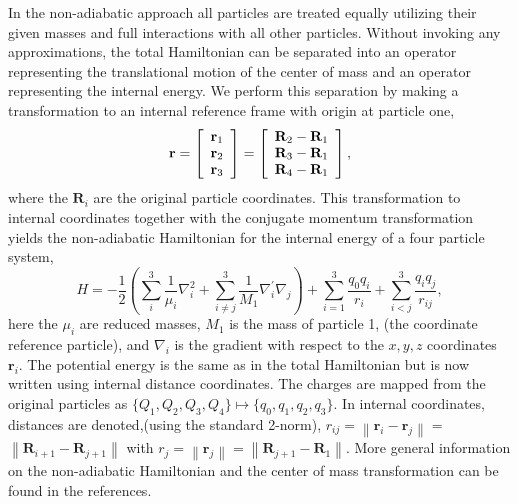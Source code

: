 \documentclass[12pt]{article}
\begin{document}
In the non-adiabatic approach all particles are treated equally utilizing
their given masses and full interactions with all other particles. 
Without invoking any approximations, the total Hamiltonian 
can be separated into an operator representing the translational motion
of the center of mass and an operator representing the internal energy.
We perform this separation by making a transformation to an internal
reference frame with origin at particle one,
\begin{equation} \label{rdef}
\mathbf{r}=\left[
  \begin{array}[c]{c}
    \mathbf{r}_{1}\\
    \mathbf{r}_{2}\\
    \mathbf{r}_{3}
  \end{array}
  \right]  
  = \left[
    \begin{array}[c]{c}
      \mathbf{R}_{2}-\mathbf{R}_{1}\\
      \mathbf{R}_{3}-\mathbf{R}_{1}\\
      \mathbf{R}_{4}-\mathbf{R}_{1}\\
    \end{array}
  \right],
\end{equation}
where the $\mathbf{R}_{i}$ are the original particle coordinates.
This transformation to  internal coordinates together with the 
conjugate momentum transformation yields the non-adiabatic Hamiltonian
for the internal energy of a four particle system,
\begin{equation} \label{intham1}
H=-\frac{1}{2}\left(  \sum_{i}^{3}\frac{1}{\mu_{i}}\nabla_{i}^{2}
  +\sum_{i\neq j}^{3}\frac{1}{M_{1}}\nabla_{i}^{\prime}\nabla_{j} \right)
  +\sum_{i=1}^{3}\frac{q_{0}q_{i}}{r_{i}}  
  +\sum_{i<j}^{3}\frac{q_{i}q_{j}}{r_{ij}},
\end{equation}
here the $\mu_{i}$ are reduced masses, $M_{1}$ is the mass of particle 1,
(the coordinate reference particle), and $\nabla_{i}$ is the gradient with
respect to the $x,y,z$ coordinates $\mathbf{r}_{i}$. The potential energy is
the same as in the total Hamiltonian but is now written using internal
distance coordinates. The charges are mapped from the original particles as
$\{Q_{1},Q_{2},Q_{3},Q_{4}\}\mapsto\{q_{0},q_{1},q_{2},q_{3}\}$. 
In internal coordinates, distances are denoted,(using the standard 2-norm), 
$r_{ij}=\left\|  \mathbf{r}_{i}-\mathbf{r}_{j}\right\|  =$ 
$\left\|  \mathbf{R}_{i+1}-\mathbf{R}_{j+1}\right\|$ with 
$r_{j}=\left\|  \mathbf{r}_{j}\right\|  =
\left\|  \mathbf{R}_{j+1}-\mathbf{R}_{1}\right\|$.
More general information on the non-adiabatic Hamiltonian and the 
center of mass transformation can be found in the references\cite{Kinghorn99a}.
\end{document}
